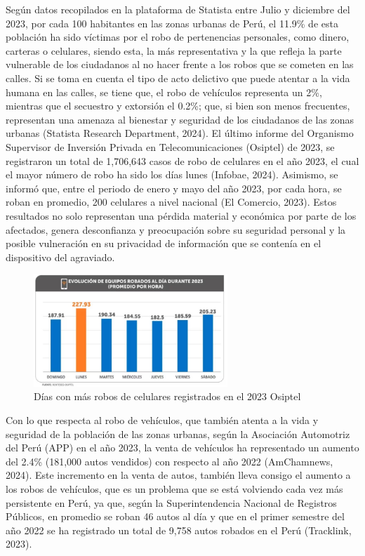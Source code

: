 Según datos recopilados en la plataforma de Statista entre Julio y diciembre del 2023, por cada 100 habitantes en las zonas urbanas de Perú, el 11.9\% de esta población ha sido víctimas por el robo de pertenencias personales, como dinero, carteras o celulares, siendo esta, la más representativa y la que refleja la parte vulnerable de los ciudadanos al no hacer frente a los robos que se cometen en las calles. Si se toma en cuenta el tipo de acto delictivo que puede atentar a la vida humana en las calles, se tiene que, el robo de vehículos representa un 2\%, mientras que el secuestro y extorsión el 0.2\%; que, si bien son menos frecuentes, representan una amenaza al bienestar y seguridad de los ciudadanos de las zonas urbanas (Statista Research Department, 2024). El último informe del Organismo Supervisor de Inversión Privada en Telecomunicaciones (Osiptel) de 2023, se registraron un total de 1,706,643 casos de robo de celulares en el año 2023, el cual el mayor número de robo ha sido los días lunes (Infobae, 2024). Asimismo, se informó que, entre el periodo de enero y mayo del año 2023, por cada hora, se roban en promedio, 200 celulares a nivel nacional (El Comercio, 2023). Estos resultados no solo representan una pérdida material y económica por parte de los afectados, genera desconfianza y preocupación sobre su seguridad personal y la posible vulneración en su privacidad de información que se contenía en el dispositivo del agraviado.
\begin{figure}[h]
	\begin{center}
		\includegraphics[width=0.65\textwidth]{1/figures/fig1.jpg}
		\caption{Días con más robos de celulares registrados en el 2023 Osiptel}
		\label{1:fig2}
	\end{center}
\end{figure}


Con lo que respecta al robo de vehículos, que también atenta a la vida y seguridad de la población de las zonas urbanas, según la Asociación Automotriz del Perú (APP) en el año 2023, la venta de vehículos ha representado un aumento del 2.4\% (181,000 autos vendidos) con respecto al año 2022 (AmChamnews, 2024). Este incremento en la venta de autos, también lleva consigo el aumento a los robos de vehículos, que es un problema que se está volviendo cada vez más persistente en Perú, ya que, según la Superintendencia Nacional de Registros Públicos, en promedio se roban 46 autos al día y que en el primer semestre del año 2022 se ha registrado un total de 9,758 autos robados en el Perú (Tracklink, 2023). 

